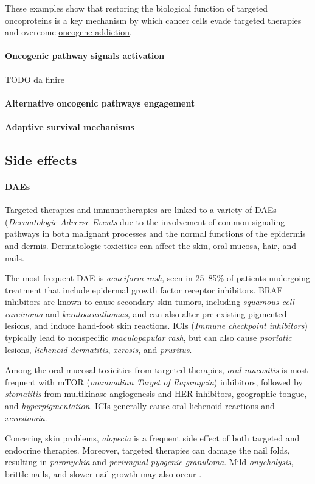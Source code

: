 These examples show that restoring the biological function of targeted oncoproteins is a key mechanism by which cancer cells evade targeted therapies and overcome \href{https://en.wikipedia.org/wiki/Oncogene_addiction}{oncogene addiction}.

\paragraph{Oncogenic pathway signals activation}

TODO da finire

\paragraph{Alternative oncogenic pathways engagement}

\paragraph{Adaptive survival mechanisms}

\subsection{Side effects}

\paragraph{DAEs}

Targeted therapies and immunotherapies are linked to a variety of DAEs (\textit{Dermatologic Adverse Events} due to the involvement of common signaling pathways in both malignant processes and the normal functions of the epidermis and dermis. Dermatologic toxicities can affect the skin, oral mucosa, hair, and nails.

The most frequent DAE is \textit{acneiform rash}, seen in 25–85\% of patients undergoing treatment that include epidermal growth factor receptor inhibitors. BRAF inhibitors are known to cause secondary skin tumors, including \textit{squamous cell carcinoma} and \textit{keratoacanthomas}, and can also alter pre-existing pigmented lesions, and induce hand-foot skin reactions. ICIs (\textit{Immune checkpoint inhibitors})  typically lead to nonspecific \textit{maculopapular rash}, but can also cause \textit{psoriatic} lesions, \textit{lichenoid dermatitis}, \textit{xerosis}, and \textit{pruritus}.

Among the oral mucosal toxicities from targeted therapies, \textit{oral mucositis} is most frequent with mTOR (\textit{mammalian Target of Rapamycin}) inhibitors, followed by \textit{stomatitis} from multikinase angiogenesis and HER inhibitors, geographic tongue, and \textit{hyperpigmentation}. ICIs generally cause oral lichenoid reactions and \textit{xerostomia}.

Concering skin problems, \textit{alopecia} is a frequent side effect of both targeted and endocrine therapies. Moreover, targeted therapies can damage the nail folds, resulting in \textit{paronychia} and \textit{periungual pyogenic granuloma}. Mild \textit{onycholysis}, brittle nails, and slower nail growth may also occur \cite{skin_nails}.

\cleardoublepage
